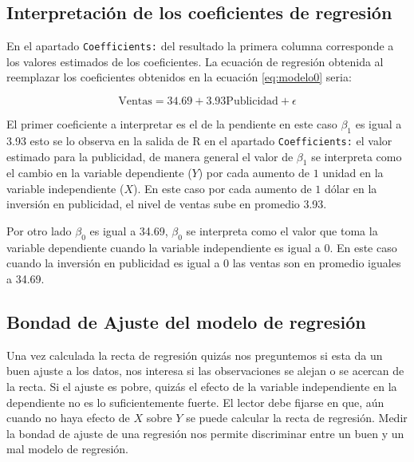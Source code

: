 \documentclass[
]{krantz}
\begin{document}
\hypertarget{coefregre}{%
\subsection{Interpretación de los coeficientes de regresión}\label{coefregre}}

En el apartado \texttt{Coefficients:} del resultado la primera columna corresponde a los valores estimados de los coeficientes. La ecuación de regresión obtenida al reemplazar los coeficientes obtenidos en la ecuación \eqref{eq:modelo0} seria:

\begin{equation}
\text{Ventas} = 34.69 + 3.93\text{Publicidad} + \epsilon 
    \label{eq:modelo}
\end{equation}

El primer coeficiente a interpretar es el de la pendiente en este caso \(\beta_1\) es igual a 3.93 esto se lo observa en la salida de R en el apartado \texttt{Coefficients:} el valor estimado para la publicidad, de manera general el valor de \(\beta_1\) se interpreta como el cambio en la variable dependiente (\(Y\)) por cada aumento de \(1\) unidad en la variable independiente (\(X\)). En este caso por cada aumento de \(1\) dólar en la inversión en publicidad, el nivel de ventas sube en promedio 3.93.

Por otro lado \(\beta_0\) es igual a 34.69, \(\beta_0\) se interpreta como el valor que toma la variable dependiente cuando la variable independiente es igual a \(0\). En este caso cuando la inversión en publicidad es igual a \(0\) las ventas son en promedio iguales a 34.69.

\hypertarget{bondad-de-ajuste-del-modelo-de-regresion}{%
\subsection{Bondad de Ajuste del modelo de regresión}\label{bondad-de-ajuste-del-modelo-de-regresion}}

Una vez calculada la recta de regresión quizás nos preguntemos si esta da un buen ajuste a los datos, nos interesa si las observaciones se alejan o se acercan de la recta. Si el ajuste es pobre, quizás el efecto de la variable independiente en la dependiente no es lo suficientemente fuerte. El lector debe fijarse en que, aún cuando no haya efecto de \(X\) sobre \(Y\) se puede calcular la recta de regresión. Medir la bondad de ajuste de una regresión nos permite discriminar entre un buen y un mal modelo de regresión.
\end{document}
